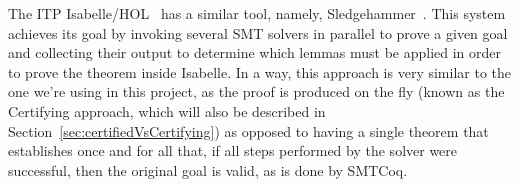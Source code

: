The ITP Isabelle/HOL~\cite{Nipkow2002} has a similar tool,
namely, Sledgehammer~\cite{sledgehammer}. This system achieves its goal by
invoking several SMT solvers in parallel to prove a given goal and collecting
their output to determine which lemmas must be applied in order to prove the theorem
inside Isabelle. In a way, this approach is very similar to the one we're using in this project, as the proof is produced on
the fly (known as the Certifying approach, which will also be described in Section~\ref{sec:certifiedVsCertifying}) as opposed
to having a single theorem that establishes once and for all
that, if all steps performed by the solver were successful,
then the original goal is valid, as is done by SMTCoq.
